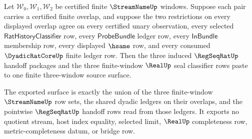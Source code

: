 \begin{theorem}
\label{thm:streamname-regseqrat-real-triple-overlap-pasting}
Let $\mathcal{W}_0,\mathcal{W}_1,\mathcal{W}_2$ be certified finite
$\StreamNameUp$ windows. Suppose each pair carries a certified finite overlap,
and suppose the two restrictions on every displayed overlap agree on every
certified unary observation, every selected
$\mathsf{RatHistoryClassifier}$ row, every $\mathsf{ProbeBundle}$ ledger row,
every $\mathsf{InBundle}$ membership row, every displayed $\hsame$ row, and
every consumed $\DyadicRatCoreUp$ finite ledger row. Then the three induced
$\RegSeqRatUp$ handoff packages and the three finite-window $\RealUp$ seal
classifier rows paste to one finite three-window source surface.

The exported surface is exactly the union of the three finite-window
$\StreamNameUp$ row sets, the shared dyadic ledgers on their overlaps, and the
pointwise $\RegSeqRatUp$ handoff rows read from those ledgers. It exports no
quotient stream, host index equality, selected limit, $\RealUp$ completeness
row, metric-completeness datum, or bridge row.
\end{theorem}
